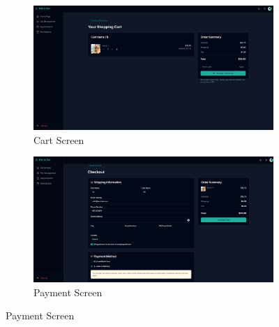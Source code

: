 \documentclass[12pt,a4paper,twoside]{book}
\begin{document}
\begin{figure}[H]
    \centering
    \begin{subfigure}[b]{0.48\textwidth}
        \centering
        \includegraphics[width=\textwidth]{Resources/Final UI/cart.png}
        \caption{Cart Screen}\label{fig:cart}
    \end{subfigure}
    \hfill
    \begin{subfigure}[b]{0.48\textwidth}
        \centering
        \includegraphics[width=\textwidth]{Resources/Final UI/payment.png}
        \caption{Payment Screen}\label{fig:payment}
    \end{subfigure}
\end{figure}
\end{document}
